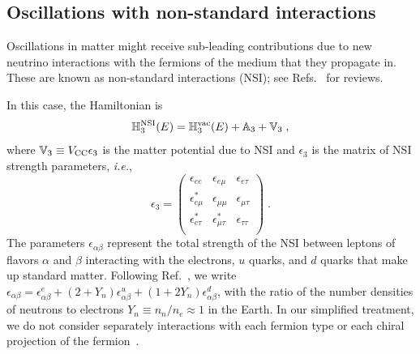 \documentclass[final,5p,times,twocolumn]{elsarticle}
\newcommand{\ie}{{\it i.e.}}
\newcommand{\Ref}{Ref.}
\newcommand{\Refs}{Refs.}
\begin{document}
\subsection{Oscillations with non-standard interactions}

Oscillations in matter might receive sub-leading contributions due to new neutrino interactions with the fermions of the medium that they propagate in.  These are known as non-standard interactions (NSI); see \Refs\ \cite{Ohlsson:2012kf, Miranda:2015dra, Farzan:2017xzy, Esteban:2018ppq} for reviews.  

In this case, the Hamiltonian is
\begin{equation}
 \label{equ:h3_nsi}
 \mathbb{H}_3^{\rm NSI}(E)
 =
 \mathbb{H}_3^{\rm vac}(E) + \mathbb{A}_3 + \mathbb{V}_3  \;,
\end{equation}
where $\mathbb{V}_3 \equiv V_{\rm CC} \epsilon_3$ is the matter potential due to NSI and $\epsilon_3$ is the matrix of NSI strength parameters, \ie,
\begin{equation}
 \label{equ:epsilon_3}
 \epsilon_3
 =
 \left(
  \begin{array}{ccc}
   \epsilon_{ee}         & \epsilon_{e\mu}         & \epsilon_{e\tau} \\
   \epsilon_{e\mu}^\ast  & \epsilon_{\mu\mu}       & \epsilon_{\mu\tau} \\
   \epsilon_{e\tau}^\ast & \epsilon_{\mu\tau}^\ast & \epsilon_{\tau\tau} \\
  \end{array}
 \right) \;.
\end{equation}
The parameters $\epsilon_{\alpha\beta}$ represent the total strength of the NSI between leptons of flavors $\alpha$ and $\beta$ interacting with the electrons, $u$ quarks, and $d$ quarks that make up standard matter.  Following \Ref\ \cite{Esteban:2018ppq}, we write $\epsilon_{\alpha\beta} = \epsilon_{\alpha\beta}^e + (2+ Y_n)\epsilon_{\alpha\beta}^u + (1+2Y_n)\epsilon_{\alpha\beta}^d$, with the ratio of the number densities of neutrons to electrons $Y_n \equiv n_n/n_e \approx 1$ in the Earth.  In our simplified treatment, we do not consider separately interactions with each fermion type or each chiral projection of the fermion\ \cite{Ohlsson:2012kf, Miranda:2015dra, Farzan:2017xzy, Esteban:2018ppq}.  
\end{document}
